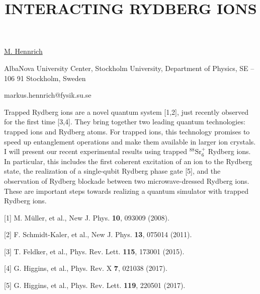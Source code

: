 \title{INTERACTING RYDBERG IONS}

\underline{M. Hennrich} 

{\normalsize{\vspace{-4mm}
AlbaNova University Center,
Stockholm University,
Department of Physics,
SE – 106 91 Stockholm,
Sweden

\email markus.hennrich@fysik.su.se}}

Trapped Rydberg ions are a novel quantum system [1,2], just recently observed for the first time [3,4]. They bring together two leading quantum technologies: trapped ions and Rydberg atoms. For trapped ions, this technology promises to speed up entanglement operations and make them available in larger ion crystals. I will present our recent experimental results using trapped $^{88}\text{Sr}_6^+$ Rydberg ions.  In particular, this includes the first coherent excitation of an ion to the Rydberg state, the realization of a single-qubit Rydberg phase gate [5], and the observation of Rydberg blockade between two microwave-dressed Rydberg ions. These are important steps towards realizing a quantum simulator with trapped Rydberg ions.

{\normalsize
[1] M. Müller, et al., New J. Phys. \textbf{10}, 093009 (2008).
\vsp

[2] F. Schmidt-Kaler, et al., New J. Phys. \textbf{13}, 075014 (2011).
\vsp

[3] T. Feldker, et al., Phys. Rev. Lett. \textbf{115}, 173001 (2015).
\vsp

[4] G. Higgins, et al., Phys. Rev. X \textbf{7}, 021038 (2017).
\vsp

[5] G. Higgins, et al., Phys. Rev. Lett. \textbf{119}, 220501 (2017).
}

\vspace{\baselineskip} 